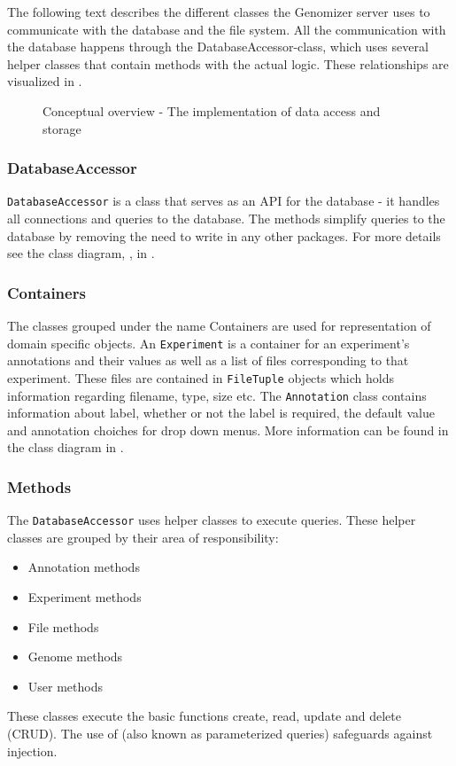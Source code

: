 The following text describes the different classes the Genomizer server uses to communicate with the database and the file system. All the communication with the database happens through the DatabaseAccessor-class, which uses several helper classes that contain methods with the actual logic. These relationships are visualized in . 

\begin{figure}[h]
\caption{Conceptual overview - The implementation of data access and storage}
\label{fig:dat_overview_schema}
\end{figure}

\subsubsection{DatabaseAccessor}
\texttt{DatabaseAccessor} is a class that serves as an API for the  database - it handles all connections and queries to the database. The methods simplify queries to the database by removing the need to write  in any other packages. For more details see the class diagram, , in .

\subsubsection{Containers}
The classes grouped under the name Containers are used for representation of domain specific objects. An \texttt{Experiment} is a container for an experiment's annotations and their values as well as a list of files corresponding to that experiment. These files are contained in \texttt{FileTuple} objects which holds information regarding filename, type, size etc. The \texttt{Annotation} class contains information about label, whether or not the label is required, the default value and annotation choiches for drop down menus. More information can be found in the class diagram  in .

\subsubsection{Methods}
The \texttt{DatabaseAccessor} uses helper classes to execute  queries. These helper classes are grouped by their area of responsibility:
\begin{itemize}
\item Annotation methods
\item Experiment methods
\item File methods
\item Genome methods
\item User methods
\end{itemize}
These classes execute the basic  functions create, read, update and delete (CRUD). The use of  (also known as parameterized queries) safeguards against  injection.

